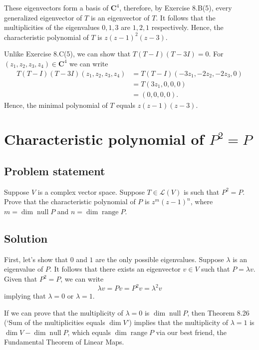 \documentclass{article}
\begin{document}
These eigenvectors form a basis of $\mathbf{C}^4$, therefore, by Exercise 8.B(5), every generalized eigenvector of $T$ is an eigenvector of $T$. 
It follows that the multiplicities of the eigenvalues $0,1,3$ are $1,2,1$ respectively. Hence, the characteristic polynomial of $T$ is $z(z-1)^2(z-3)$.

Unlike Exercise 8.C(5), we can show that $T(T-I)(T-3I)=0$. 
For $(z_1,z_2,z_3,z_4)\in\mathbf{C}^4$ we can write
\begin{align*}
    T(T-I)(T-3I)(z_1,z_2,z_3,z_4)&=T(T-I)(-3z_1,-2z_2,-2z_3,0)\\
    &=T(3z_1,0,0,0)\\
    &=(0,0,0,0).
\end{align*}
Hence, the minimal polynomial of $T$ equals $z(z-1)(z-3)$.

\clearpage

\section{Characteristic polynomial of $P^2=P$}
\subsection*{Problem statement}
Suppose $V$ is a complex vector space. Suppose $T\in\mathcal{L}(V)$ is such that \newline
$P^2=P$. 
Prove that the characteristic polynomial of $P$ is $z^m(z-1)^n$, where \newline
$m=\operatorname{dim}\operatorname{null}P$ and $n=\operatorname{dim}\operatorname{range}P$.

\subsection*{Solution}
First, let's show that $0$ and $1$ are the only possible eigenvalues. Suppose $\lambda$ is an eigenvalue of $P$. 
It follows that there exists an eigenvector $v\in V$ such that $P=\lambda v$. Given that $P^2=P$, we can write
\begin{equation}
    \lambda v=Pv=P^2v=\lambda^2v
\end{equation}
implying that $\lambda=0$ or $\lambda=1$.

If we can prove that the multiplicity of $\lambda=0$ is $\operatorname{dim}\operatorname{null}P$, then Theorem 8.26 (`Sum of the multiplicities equals $\operatorname{dim}V$') implies that the multiplicity of $\lambda=1$ is $\operatorname{dim}V-\operatorname{dim}\operatorname{null}P$, which equals $\operatorname{dim}\operatorname{range}P$ via our best friend, the Fundamental Theorem of Linear Maps.
\end{document}

